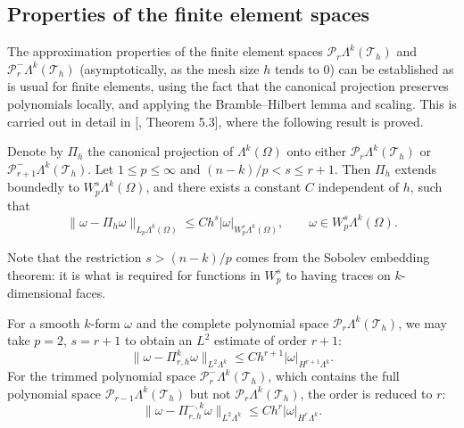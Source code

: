 \subsection{{Properties of the finite element spaces}}\label{sec:finite-element-space-properties}

{The approximation properties of the finite element spaces $\mathcal P_r\Lambda^k(\mathcal T_h)$ and $\mathcal P_r^-\Lambda^k(\mathcal T_h)$ (asymptotically, as the mesh size $h$ tends to $0$) can be established as is usual for finite elements, using the fact that the canonical projection preserves polynomials locally, and applying the Bramble–Hilbert lemma and scaling. This is carried out in detail in [, Theorem 5.3], where the following result is proved.}

\begin{Theorem}\label{thm:canonical-projection-approximation}
{Denote by $\Pi_h$ the canonical projection of $\Lambda^k(\Omega)$ onto either $\mathcal P_r\Lambda^k(\mathcal T_h)$ or $\mathcal P_{r+1}^-\Lambda^k(\mathcal T_h)$. Let $1\leq p\leq\infty$ and $(n-k)/p<s\leq r+1$. Then $\Pi_h$ extends boundedly to $W_p^s\Lambda^k(\Omega)$, and there exists a constant $C$ independent of $h$, such that}
\[
\|\omega-\Pi_h\omega\|_{L_p\Lambda^k(\Omega)}\leq Ch^s|\omega|_{W_p^s\Lambda^k(\Omega)},\qquad\omega\in W_p^s\Lambda^k(\Omega).
\]
\end{Theorem}

{Note that the restriction $s>(n-k)/p$ comes from the Sobolev embedding theorem: it is what is required for functions in $W_p^s$ to having traces on $k$-dimensional faces.}

{For a smooth $k$-form $\omega$ and the complete polynomial space $\mathcal P_r\Lambda^k(\mathcal T_h)$, we may take $p=2$, $s=r+1$ to obtain an $L^2$ estimate of order $r+1$:}
\[
\|\omega-\Pi_{r,h}^k\omega\|_{L^2\Lambda^k}\leq Ch^{r+1}|\omega|_{H^{r+1}\Lambda^k}.
\]
{For the trimmed polynomial space $\mathcal P_r^-\Lambda^k(\mathcal T_h)$, which contains the full polynomial space $\mathcal P_{r-1}\Lambda^k(\mathcal T_h)$ but not $\mathcal P_r\Lambda^k(\mathcal T_h)$, the order is reduced to $r$:}
\[
\|\omega-\Pi_{r,h}^{-,k}\omega\|_{L^2\Lambda^k}\leq Ch^r|\omega|_{H^r\Lambda^k}.
\]

